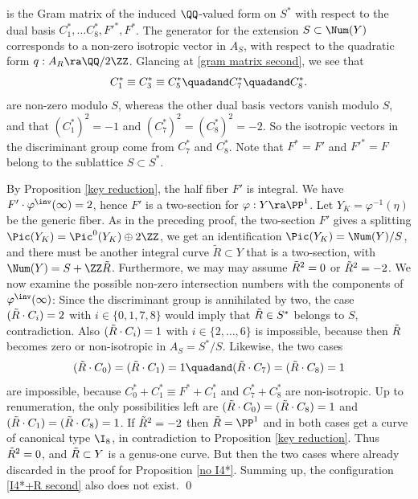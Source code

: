is the Gram matrix of the induced $\QQ$-valued form on $S^*$ with respect to the dual basis $C_1^*,\ldots C_8^*,F'^*, F^*$.
The generator for the extension $S\subset\Num(Y)$   corresponds  to a non-zero isotropic vector in $A_S$, with
respect to the quadratic form $q:A_R\ra\QQ/2\ZZ$.
Glancing at \eqref{gram matrix second}, we see that
$$
C_1^*\equiv C_3^*\equiv C_5^*\quadand C_7^*\quadand C_8^*.
$$
are non-zero modulo $S$,     whereas the other dual basis vectors vanish modulo  $S$, and that
$(C_1^*)^2=-1$ and $(C_7^*)^2=(C_8^*)^2=-2$. So the isotropic vectors in the discriminant group come from $C_7^*$ and $C_8^*$.
Note that   $F^*=F'$ and $F'^*=F$ belong to the sublattice $S\subset S^*$.

By Proposition \ref{key reduction}, the half fiber  $F'$ is   integral.
We have $F'\cdot \varphi^\inv(\infty) =2$, hence $F'$ is a two-section for  $\varphi:Y\ra\PP^1$.
Let  $Y_K=\varphi^{-1}(\eta)$ be the generic fiber.
As in the preceding proof, the two-section $F'$ gives a splitting $\Pic(Y_K)=\Pic^0(Y_K)\oplus 2\ZZ$,
we get an identification $\Pic(Y_K)=\Num(Y)/S$,
and there must be another integral curve $\tilde{R}\subset Y$ that is a two-section,
with $\Num(Y)=S+\ZZ\tR$. Furthermore, we may may assume $\tilde{R}^2=0$ or $\tilde{R}^2=-2$.
We now examine the possible non-zero intersection numbers with the components of $\varphi^\inv(\infty)$:
Since the discriminant group is annihilated by two,
the case $(\tilde{R}\cdot C_i)=2$ with $i\in \{0,1,7,8\}$ would imply that $\tilde{R}\in S^*$ belongs to $S$, contradiction.
Also $(\tilde{R}\cdot C_i)=1$ with $i\in \{2,\ldots,6\}$ is impossible, because then $\tilde{R}$ becomes zero or non-isotropic in $A_S=S^*/S$.
Likewise, the two cases
$$
 (\tR\cdot C_0) = (\tR\cdot C_1) =1\quadand  (\tR\cdot C_7)=(\tR\cdot C_8)=1
$$
are impossible, because $C_0^*+C_1^*\equiv F^*+C_1^*$ and $C_7^*+C_8^*$ are non-isotropic.
Up to renumeration, the only  possibilities  left are $(\tilde{R}\cdot C_0) = (\tilde{R}\cdot C_8)=1$ and $(\tilde{R}\cdot C_1) = (\tilde{R}\cdot C_8)=1$.
If $\tilde{R}^2=-2$ then $\tR=\PP^1$ and in both cases get  a curve of canonical type $\I_8$, in contradiction to Proposition \ref{key reduction}.
Thus $\tilde{R}^2=0$, and $\tilde{R}\subset Y$ is a genus-one curve.  But then the two cases where already discarded in the proof for Proposition \ref{no I4*}.
Summing up, the configuration \eqref{I4*+R second} also does not exist.
\qed


